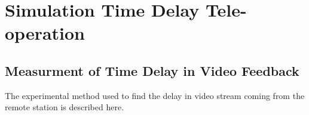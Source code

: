\chapter{Simulation Time Delay Tele-operation }
\section{Measurment of Time Delay in Video Feedback}
\label{app:DH}
The experimental method used to find the delay in video stream  coming from the remote station is described here.
